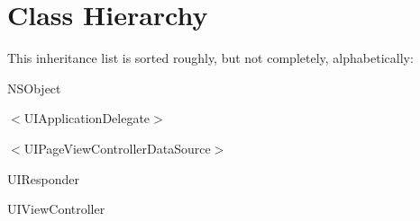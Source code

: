 \section{Class Hierarchy}
This inheritance list is sorted roughly, but not completely, alphabetically\+:\begin{DoxyCompactList}
\item N\+S\+Object\begin{DoxyCompactList}
\item {}
\end{DoxyCompactList}
\item $<$U\+I\+Application\+Delegate$>$\begin{DoxyCompactList}
\item {}
\end{DoxyCompactList}
\item $<$U\+I\+Page\+View\+Controller\+Data\+Source$>$\begin{DoxyCompactList}
\item {}
\end{DoxyCompactList}
\item U\+I\+Responder\begin{DoxyCompactList}
\item {}
\end{DoxyCompactList}
\item U\+I\+View\+Controller\begin{DoxyCompactList}
\item {}
\item {}
\end{DoxyCompactList}
\end{DoxyCompactList}
